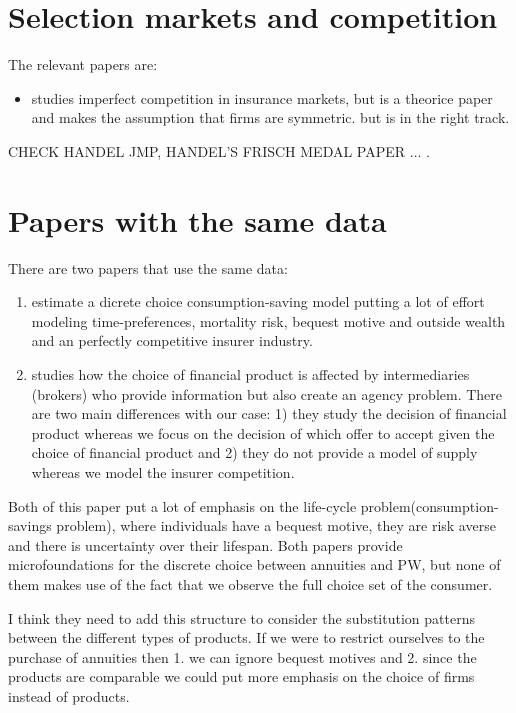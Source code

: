 \documentclass[12pt]{article}
\theoremstyle{plain}
\theoremstyle{plain}
\begin{document}
\section{Selection markets and competition}
The relevant papers are: 
\begin{itemize}
    \item \textcite{mahoney_imperfect_2017} studies imperfect competition in insurance markets, but is a theorice paper and makes the assumption that firms are symmetric. but is in the right track. 
\end{itemize}


CHECK HANDEL JMP, HANDEL'S FRISCH MEDAL PAPER ... .






\section{Papers with the same data}

There are two papers that use the same data: 
\begin{enumerate}
    \item \textcite{illanes_retirement_2019} 
    estimate a dicrete choice consumption-saving model putting a lot of effort modeling time-preferences, mortality risk, bequest motive and outside wealth and an perfectly competitive insurer industry. 
    
    \item \textcite{boehm_intermediation_2024} studies how the choice of financial product is affected by intermediaries (brokers) who provide information but also create an agency problem. There are two main differences with our case: 1) they study the decision of financial product whereas we focus on the decision of which offer to accept given the choice of financial product and 2) they do not provide a model of supply whereas we model the insurer competition. 
\end{enumerate}
Both of this paper put a lot of emphasis on the life-cycle problem(consumption-savings problem), where individuals have a bequest motive, they are risk averse and there is uncertainty over their lifespan. Both papers provide microfoundations for the discrete choice between annuities and PW, but none of them makes use of the fact that we observe the full choice set of the consumer. 

I think they need to add this structure to consider the substitution patterns between the different types of products. 
If we were to restrict ourselves to the purchase of annuities then 1. we can ignore bequest motives and 2. since the products are comparable we could put more emphasis on the choice of firms instead of products. 



\printbibliography
 
\end{document}
